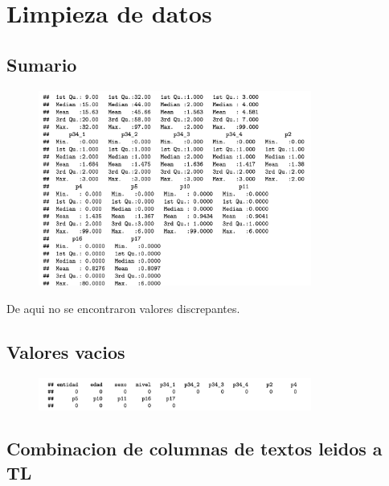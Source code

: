 \documentclass[aps,reprint]{revtex4-2}
\begin{document}
\section{Limpieza de datos}\label{data_clean}

\subsection{Sumario}
\begin{widetext}
\begin{figure}[H]
  \centering
  \includegraphics[width=0.8\textwidth]{Screenshot 2025-10-25 at 18.13.22.png}
  \label{fig:example_image}
  
\end{figure}
\end{widetext}

De aqui no se encontraron valores discrepantes.

\subsection{Valores vacios}

\begin{widetext}
\begin{figure}[H]
  \centering
  \includegraphics[width=0.8\textwidth]{Screenshot 2025-10-25 at 18.20.32.png}
\end{figure}
\end{widetext}

\subsection{Combinacion de columnas de textos leidos a TL}
\end{document}
